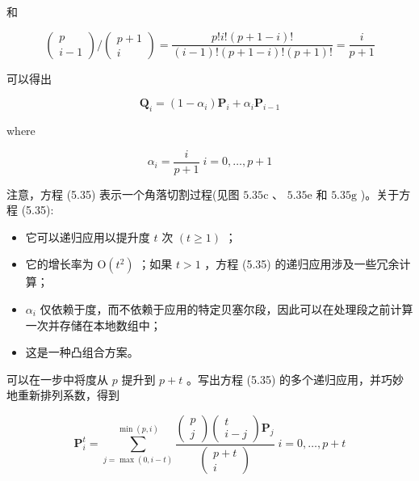 \documentclass[../main.tex]{subfiles}
\begin{document}
和

\[
\left( \begin{matrix} p \\  i - 1 \end{matrix}\right) /\left( \begin{matrix} p + 1 \\  i \end{matrix}\right)  = \frac{p!i!\left( {p + 1 - i}\right) !}{\left( {i - 1}\right) !\left( {p + 1 - i}\right) !\left( {p + 1}\right) !} = \frac{i}{p + 1}
\]

可以得出

\[
{\mathbf{Q}}_{i} = \left( {1 - {\alpha }_{i}}\right) {\mathbf{P}}_{i} + {\alpha }_{i}{\mathbf{P}}_{i - 1} \tag{5.35}
\]

where

\[
{\alpha }_{i} = \frac{i}{p + 1}\;i = 0,\ldots ,p + 1
\]

注意，方程 (5.35) 表示一个角落切割过程(见图 \({5.35}\mathrm{c}\) 、 \({5.35}\mathrm{e}\) 和 \({5.35}\mathrm{g}\) )。关于方程 (5.35):

\begin{itemize}
\item 它可以递归应用以提升度 \(t\) 次 \(\left( {t \geq  1}\right)\) ；
\end{itemize}

\begin{itemize}
\item 它的增长率为 \(\mathrm{O}\left( {t}^{2}\right)\) ；如果 \(t > 1\) ，方程 (5.35) 的递归应用涉及一些冗余计算；
\end{itemize}

\begin{itemize}
\item \({\alpha }_{i}\) 仅依赖于度，而不依赖于应用的特定贝塞尔段，因此可以在处理段之前计算一次并存储在本地数组中；
\end{itemize}

\begin{itemize}
\item 这是一种凸组合方案。
\end{itemize}

可以在一步中将度从 \(p\) 提升到 \(p + t\) 。写出方程 (5.35) 的多个递归应用，并巧妙地重新排列系数，得到

\[
{\mathbf{P}}_{i}^{t} = \mathop{\sum }\limits_{{j = \max \left( {0,i - t}\right) }}^{{\min \left( {p,i}\right) }}\frac{\left( \begin{matrix} p \\  j \end{matrix}\right) \left( \begin{matrix} t \\  i - j \end{matrix}\right) {\mathbf{P}}_{j}}{\left( \begin{matrix} p + t \\  i \end{matrix}\right) }\;i = 0,\ldots ,p + t \tag{5.36}
\]
\end{document}
